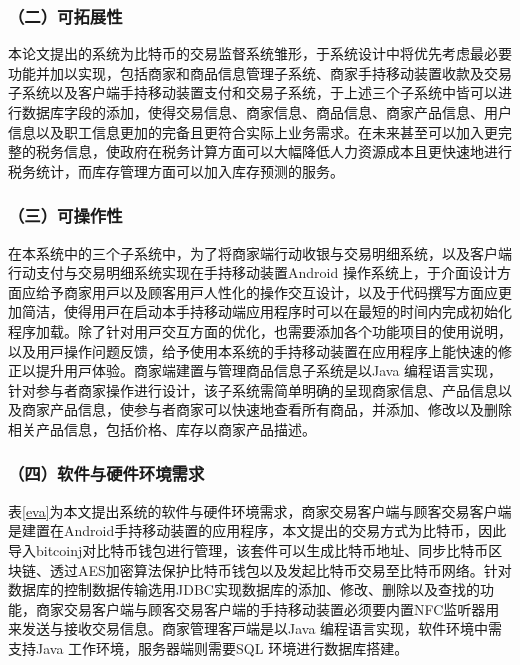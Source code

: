 	\subsubsection{（二）可拓展性}

	本论文提出的系统为比特币的交易监督系统雏形，于系统设计中将优先考虑最必要功能并加以实现，包括商家和商品信息管理子系统、商家手持移动装置收款及交易子系统以及客户端手持移动装置支付和交易子系统，于上述三个子系统中皆可以进行数据库字段的添加，使得交易信息、商家信息、商品信息、商家产品信息、用户信息以及职工信息更加的完备且更符合实际上业务需求。在未来甚⾄可以加⼊更完整的税务信息，使政府在税务计算⽅⾯可以大幅降低⼈⼒资源成本且更快速地进⾏税务统计，而库存管理⽅⾯可以加⼊库存预测的服务。

	\subsubsection{（三）可操作性}
	在本系统中的三个⼦系统中，为了将商家端⾏动收银与交易明细系统，以及客户端⾏动⽀付与交易明细系统实现在手持移动装置Android 操作系统上，于介⾯设计⽅⾯应给予商家⽤⼾以及顾客⽤⼾⼈性化的操作交互设计，以及于代码撰写⽅⾯应更加简洁，使得⽤⼾在启动本⼿持移动端应⽤程序时可以在最短的时间内完成初始化程序加载。除了针对⽤⼾交互⽅⾯的优化，也需要添加各个功能项⽬的使⽤说明，以及⽤⼾操作问题反馈，给予使用本系统的手持移动装置在应⽤程序上能快速的修正以提升⽤⼾体验。商家端建置与管理商品信息⼦系统是以Java 编程语⾔实现，针对参与者商家操作进⾏设计，该⼦系统需简单明确的呈现商家信息、产品信息以及商家产品信息，使参与者商家可以快速地查看所有商品，并添加、修改以及删除相关产品信息，包括价格、库存以商家产品描述。

	\subsubsection{（四）软件与硬件环境需求}
	表\ref{eva}为本文提出系统的软件与硬件环境需求，商家交易客户端与顾客交易客户端是建置在Android手持移动装置的应用程序，本文提出的交易方式为比特币，因此导入bitcoinj\supercite{Bitcoinclients}对比特币钱包进行管理，该套件可以生成比特币地址、同步比特币区块链、透过AES加密算法保护比特币钱包以及发起比特币交易至比特币网络。针对数据库的控制数据传输选用JDBC\supercite{JDBCdatabaseaccesswithJava:atutorialandannotatedreference}实现数据库的添加、修改、删除以及查找的功能，商家交易客户端与顾客交易客户端的手持移动装置必须要内置NFC监听器用来发送与接收交易信息。商家管理客⼾端是以Java 编程语⾔实现，软件环境中需⽀持Java ⼯作环境，服务器端则需要SQL 环境进行数据库搭建。


